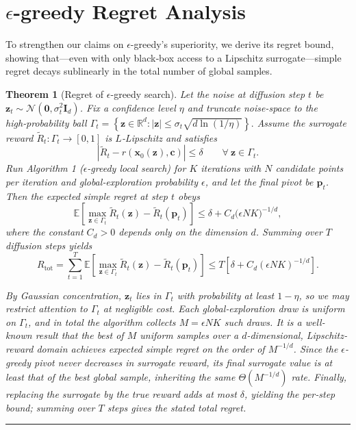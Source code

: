 \documentclass{article}
\newcommand{\BlackBox}{\rule{1.5ex}{1.5ex}}  %
\newenvironment{proof}{\par\noindent{\bf Proof\ }}{\hfill\BlackBox\\[2mm]}
\newtheorem{theorem}{Theorem}
\begin{document}
\section{$\epsilon$-greedy Regret Analysis}
\label{app:theory}

To strengthen our claims on $\epsilon$-greedy's superiority, we derive its regret bound, showing that—even with only black‑box access to a Lipschitz surrogate—simple regret decays sublinearly in the total number of global samples.

\begin{theorem}[Regret of $\epsilon$-greedy search]
\label{}
Let the noise at diffusion step $t$ be $\mathbf{z}_t \sim \mathcal{N}(\mathbf{0}, \sigma_t^2\mathbf{I}_d)$. Fix a confidence level $\eta$ and truncate noise-space to the high‑probability ball $\Gamma_t = \left\{ \mathbf{z} \in \mathbb{R}^d : \lvert \mathbf{z} \rvert \leq \sigma_t \sqrt{d \ln (1/\eta)} \right\}.$ Assume the surrogate reward $\tilde{R}_t: \Gamma_t \to [0,1]$ is $L$‑Lipschitz and satisfies 
\begin{equation*}
    \left|\tilde{R}_t - r(\mathbf{x}_0(\mathbf{z}), \mathbf{c})\right| \leq \delta \qquad  \forall \: \mathbf{z} \in \Gamma_t.
\end{equation*}
Run Algorithm 1 ($\epsilon$-greedy local search) for $K$ iterations with $N$ candidate points per iteration and global‑exploration probability 
$\epsilon$, and let the final pivot be 
$\mathbf{p}_t$. Then the expected simple regret at step $t$
 obeys
 \begin{equation*}
     \mathbb{E}\!\left[ \max_{\mathbf{z} \in \Gamma_t} \widetilde{R}_t(\mathbf{z}) - \widetilde{R}_t(\mathbf{p}_t) \right] 
\leq \delta + C_d \bigl( \epsilon N K \bigr)^{-1/d},
 \end{equation*}
 where the constant $C_d > 0$ depends only on the dimension $d$. Summing over $T$ diffusion steps yields
 \begin{equation*}
     R_{\text{tot}}
= \sum_{t=1}^T 
\mathbb{E}\!\left[ \max_{\mathbf{z} \in \Gamma_t} \widetilde{R}_t(\mathbf{z}) - \widetilde{R}_t(\mathbf{p}_t) \right]
\leq T \left[ \delta + C_d (\epsilon N K)^{-1/d} \right].
 \end{equation*}

 \begin{proof}
     By Gaussian concentration, $\mathbf{z}_t$ lies in $\Gamma_t$ with probability at least $1-\eta$, so we may restrict attention to $\Gamma_t$ at negligible cost. Each global‐exploration draw is uniform on $\Gamma_t$, and in total the algorithm collects $M = \epsilon NK$ such draws. It is a well-known result that the best of $M$ uniform samples over a $d$-dimensional, Lipschitz‐reward domain achieves expected simple regret on the order of $M^{-1/d}$. Since the $\epsilon$-greedy pivot never decreases in surrogate reward, its final surrogate value is at least that of the best global sample, inheriting the same $\Theta(M^{-1/d})$ rate. Finally, replacing the surrogate by the true reward adds at most $\delta$, yielding the per‑step bound; summing over $T$ steps gives the stated total regret.
 \end{proof}
\end{theorem}
\end{document}
